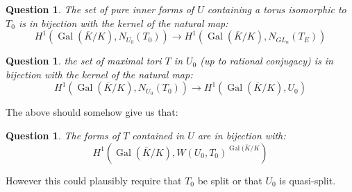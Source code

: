 \documentclass{article}
\theoremstyle{plain}
\newtheorem{question}[theorem]{Question}
\theoremstyle{definition}
\numberwithin{equation}{section}
\DeclareMathOperator{\Gal}{Gal}
\begin{document}
\begin{question}
The set of pure inner forms of $U$ containing a torus isomorphic to $T_0$ is in bijection with the kernel of the natural map:
\[ H^1( \Gal(\overline{K}/K), N_{U_0}(T_0) ) \rightarrow H^1( \Gal(\overline{K}/K),N_{GL_n}(T_E )) \]
\end{question}

\begin{question}
the set of maximal tori $T$ in $U_0$ (up to rational conjugacy) is in bijection with the kernel of the natural map:
\[  H^1( \Gal(\overline{K}/K), N_{U_0}(T_0) ) \rightarrow H^1( \Gal(\overline{K}/K), U_0) \]
\end{question}

The above should somehow give us that:
\begin{question}
The forms of $T$ contained in $U$ are in bijection with:
\[ H^1(\Gal(\overline{K}/K), W(U_0,T_0)^{\Gal(\overline{K}/K} ) \]
\end{question}
However this could plausibly require that $T_0$ be split or that $U_0$ is quasi-split.
\end{document}
